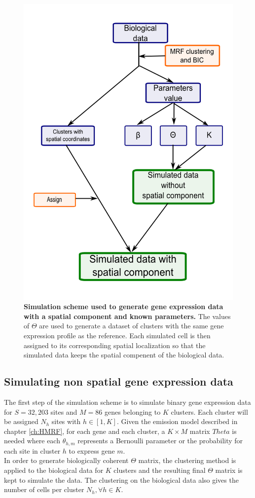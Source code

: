 	\begin{figure}[H]
\centerline{\includegraphics[width=0.6\linewidth]{gfx/chapter5/simulation_scheme.png}}
\caption{{\bf Simulation scheme used to generate gene expression data with a spatial component and known parameters.} The values of $\Theta$ are used to generate a dataset of clusters with the same gene expression profile as the reference. Each simulated cell is then assigned to its corresponding spatial localization so that the simulated data keeps the spatial compenent of the biological data.}
\label{fig:simulationScheme}
	\end{figure}
	
	\subsection{Simulating non spatial gene expression data}\label{subsec:simul_non_spatial}
	The first step of the simulation scheme is to simulate binary gene expression data for $S=32,203$ sites and $M=86$ genes belonging to $K$ clusters. Each cluster will be assigned $N_h$ sites with $h \in [1,K]$. Given the emission model described in chapter \ref{ch:HMRF}, for each gene and each cluster, a $K \times M$ matrix $Theta$ is needed where each $\theta_{h,m}$ represents a Bernoulli parameter or the probability for each site in cluster $h$ to express gene $m$.\\
	
	In order to generate biologically coherent $\Theta$ matrix, the clustering method is applied to the biological data for $K$ clusters and the resulting final $\Theta$ matrix is kept to simulate the data. The clustering on the biological data also gives the number of cells per cluster $N_h, \forall h \in K$.\\
	
